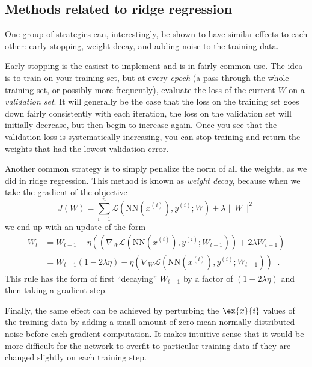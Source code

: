 \subsection{Methods related to ridge regression}

One group of strategies can, interestingly, be shown to have similar
effects to each other: early stopping, weight decay, and adding noise
to the training data. 

Early stopping is the easiest to implement and is in fairly common
use.  The idea is to train on your training set, but at every {\em
  epoch} (a pass through the whole training set, or possibly more
frequently), evaluate the loss of the current $W$ on a {\em validation
  set}.  It will generally be the case that the loss on the training
set goes down fairly consistently with each iteration, the loss on the
validation set will initially decrease, but then begin to increase
again.  Once you see that the validation loss is systematically
increasing, you can stop training and return the weights that had the
lowest validation error.

Another common strategy is to simply penalize the norm of all the
weights, as we did in ridge regression.  This  method is known as {\em
  weight decay}, because when we take the gradient of the objective
$$ J(W) = \sum_{i = 1}^{n}\mathcal{L}(\text{NN}(x^{(i)}), y^{(i)}; W)
+ \lambda\|W\|^2 $$ 
we end up  with an update of the form
\begin{align*}
 W_t &= W_{t-1} -
       \eta\left(\left(\nabla_{W}\mathcal{L}(\text{NN}(x^{(i)}),
       y^{(i)}; W_{t-1})\right) + 2\lambda W_{t-1}\right)\\ 
& = W_{t-1}(1 - 2\lambda\eta) - \eta\left(\nabla_{W}\mathcal{L}(\text{NN}(x^{(i)}),
       y^{(i)}; W_{t-1})\right) \;\;.
\end{align*}
This rule has the form of first ``decaying'' $W_{t-1}$ by a factor of
$(1 - 2 \lambda \eta)$ and then taking a gradient step.  

Finally, the same effect can be achieved by perturbing the $\ex{x}{i}$
values of the training data by adding a small amount of zero-mean
normally distributed noise before each gradient computation.  It makes
intuitive sense that it would be more difficult for the network to
overfit to particular training data if they are changed slightly on
each training step.

